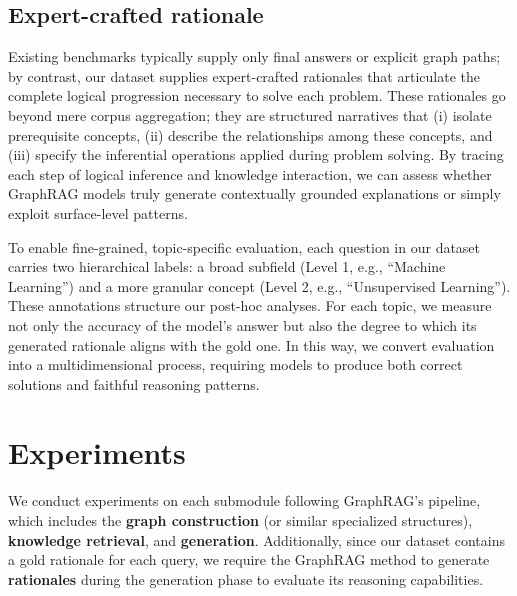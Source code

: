 \documentclass{article}
\begin{document}
\subsection{Expert-crafted rationale}
Existing benchmarks typically supply only final answers or explicit graph paths; by contrast, our dataset supplies expert-crafted rationales that articulate the complete logical progression necessary to solve each problem. These rationales go beyond mere corpus aggregation; they are structured narratives that (i) isolate prerequisite concepts, (ii) describe the relationships among these concepts, and (iii) specify the inferential operations applied during problem solving. By tracing each step of logical inference and knowledge interaction, we can assess whether GraphRAG models truly generate contextually grounded explanations or simply exploit surface-level patterns.

To enable fine-grained, topic-specific evaluation, each question in our dataset carries two hierarchical labels: a broad subfield (Level 1, e.g., ``Machine Learning'') and a more granular concept (Level 2, e.g., ``Unsupervised Learning''). These annotations structure our post-hoc analyses. For each topic, we measure not only the accuracy of the model’s answer but also the degree to which its generated rationale aligns with the gold one. In this way, we convert evaluation into a multidimensional process, requiring models to produce both correct solutions and faithful reasoning patterns.

\section{Experiments}
We conduct experiments on each submodule following GraphRAG's pipeline, which includes the \textbf{graph construction} (or similar specialized structures), \textbf{knowledge retrieval}, and \textbf{generation}. Additionally, since our dataset contains a gold rationale for each query, we require the GraphRAG method to generate \textbf{rationales} during the generation phase to evaluate its reasoning capabilities.
\end{document}
